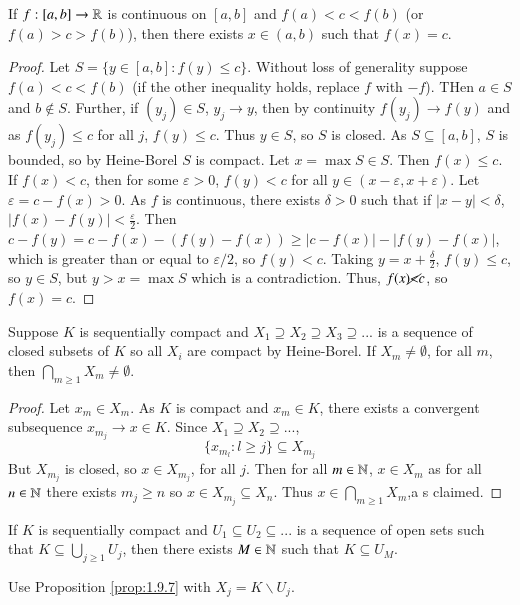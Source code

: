 \begin{namthm}
    If $f:[a,b]\rightarrow \mathbb R$ is continuous on $[a,b]$ and $f(a) < c < f(b)$ (or $f(a) > c > f(b)$), then there exists $x \in (a,b)$ such that $f(x) = c$.
\end{namthm}
\begin{proof}
    Let $S = \{y \in [a,b]: f(y) \leq c\}$. Without loss of generality suppose $f(a) < c < f(b)$ (if the other inequality holds, replace $f$ with $-f$). THen $a \in S$ and $b \notin S$. Further, if $(y_j) \in S$, $y_j\rightarrow y$, then by continuity $f(y_j)\rightarrow f(y)$ and as $f(y_j) \leq c$ for all $j$, $f(y) \leq c$. Thus $y \in S$, so $S$ is closed. As $S \subseteq [a,b]$, $S$ is bounded, so by Heine-Borel $S$ is compact. Let $x = \max S \in S$. Then $f(x) \leq c$. If $f(x) < c$, then for some $\varepsilon > 0$, $f(y) < c$ for all $y \in (x-\varepsilon,x+\varepsilon)$. Let $\varepsilon = c-f(x) > 0$. As $f$ is continuous, there exists $\delta > 0$ such that if $|x-y| < \delta$, $|f(x) - f(y)| < \frac{\varepsilon}{2}$. Then $c-f(y) = c-f(x) - (f(y) - f(x)) \geq |c-f(x)| - |f(y) - f(x)|$, which is greater than or equal to $\varepsilon/2$, so $f(y) < c$. Taking $y = x+\frac{\delta}{2}$, $f(y) \leq c$, so $y \in S$, but $y > x = \max S$ which is a contradiction. Thus, $f(x) \cancel{<} c$, so $f(x) = c$.
\end{proof}

\begin{prop}\label{prop:1.9.7}
    Suppose $K$ is sequentially compact and $X_1 \supseteq X_2 \supseteq X_3 \supseteq ...$ is a sequence of closed subsets of $K$ so all $X_i$ are compact by Heine-Borel. If $X_m \neq \emptyset$, for all $m$, then $\bigcap_{m\geq 1}X_m\neq \emptyset$.
\end{prop}
\begin{proof}
    Let $x_m \in X_m$. As $K$ is compact and $x_m \in K$, there exists a convergent subsequence $x_{m_j}\rightarrow x \in K$. Since $X_1 \supseteq X_2 \supseteq ...$, $$\{x_{m_l}: l\geq j\}\subseteq X_{m_j}$$ But $X_{m_j}$ is closed, so $x \in X_{m_j}$, for all $j$. Then for all $m \in \mathbb N$, $x \in X_m$ as for all $n \in \mathbb N$ there exists $m_j \geq n$ so $x \in X_{m_j} \subseteq X_n$. Thus $x \in \bigcap_{m\geq 1}X_m$,a s claimed.
\end{proof}

\begin{cor}\label{cor:1.9.8}
    If $K$ is sequentially compact and $U_1 \subseteq U_2 \subseteq ...$ is a sequence of open sets such that $K \subseteq \bigcup_{j\geq 1}U_j$, then there exists $M \in \mathbb N$ such that $K \subseteq U_M$.
\end{cor}
Use Proposition \ref{prop:1.9.7} with $X_j = K \backslash U_j$.

